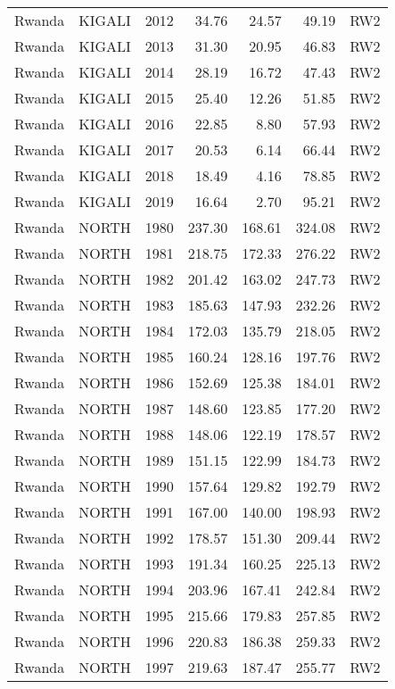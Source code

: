 \begin{longtable}{lllrrrl}
  Rwanda & KIGALI & 2012 & 34.76 & 24.57 & 49.19 & RW2 \\ 
  Rwanda & KIGALI & 2013 & 31.30 & 20.95 & 46.83 & RW2 \\ 
  Rwanda & KIGALI & 2014 & 28.19 & 16.72 & 47.43 & RW2 \\ 
  Rwanda & KIGALI & 2015 & 25.40 & 12.26 & 51.85 & RW2 \\ 
  Rwanda & KIGALI & 2016 & 22.85 & 8.80 & 57.93 & RW2 \\ 
  Rwanda & KIGALI & 2017 & 20.53 & 6.14 & 66.44 & RW2 \\ 
  Rwanda & KIGALI & 2018 & 18.49 & 4.16 & 78.85 & RW2 \\ 
  Rwanda & KIGALI & 2019 & 16.64 & 2.70 & 95.21 & RW2 \\ 
  Rwanda & NORTH & 1980 & 237.30 & 168.61 & 324.08 & RW2 \\ 
  Rwanda & NORTH & 1981 & 218.75 & 172.33 & 276.22 & RW2 \\ 
  Rwanda & NORTH & 1982 & 201.42 & 163.02 & 247.73 & RW2 \\ 
  Rwanda & NORTH & 1983 & 185.63 & 147.93 & 232.26 & RW2 \\ 
  Rwanda & NORTH & 1984 & 172.03 & 135.79 & 218.05 & RW2 \\ 
  Rwanda & NORTH & 1985 & 160.24 & 128.16 & 197.76 & RW2 \\ 
  Rwanda & NORTH & 1986 & 152.69 & 125.38 & 184.01 & RW2 \\ 
  Rwanda & NORTH & 1987 & 148.60 & 123.85 & 177.20 & RW2 \\ 
  Rwanda & NORTH & 1988 & 148.06 & 122.19 & 178.57 & RW2 \\ 
  Rwanda & NORTH & 1989 & 151.15 & 122.99 & 184.73 & RW2 \\ 
  Rwanda & NORTH & 1990 & 157.64 & 129.82 & 192.79 & RW2 \\ 
  Rwanda & NORTH & 1991 & 167.00 & 140.00 & 198.93 & RW2 \\ 
  Rwanda & NORTH & 1992 & 178.57 & 151.30 & 209.44 & RW2 \\ 
  Rwanda & NORTH & 1993 & 191.34 & 160.25 & 225.13 & RW2 \\ 
  Rwanda & NORTH & 1994 & 203.96 & 167.41 & 242.84 & RW2 \\ 
  Rwanda & NORTH & 1995 & 215.66 & 179.83 & 257.85 & RW2 \\ 
  Rwanda & NORTH & 1996 & 220.83 & 186.38 & 259.33 & RW2 \\ 
  Rwanda & NORTH & 1997 & 219.63 & 187.47 & 255.77 & RW2 \\ 

\end{longtable}
